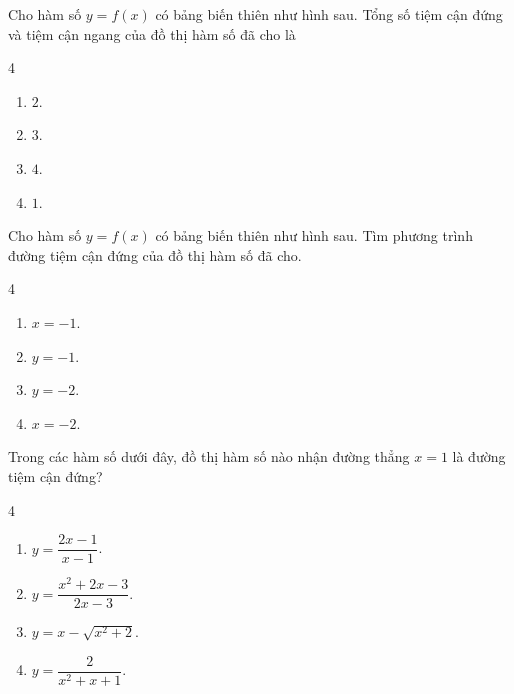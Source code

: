 \begin{baitap}
	Cho hàm số $y=f(x)$ có bảng biến thiên như hình sau. 	Tổng số tiệm cận đứng và tiệm cận ngang của đồ thị hàm số đã cho là
\begin{center}
\end{center}
	\begin{multicols}{4}
		\begin{enumerate}
			\item $2$.
			\item $3$.
			\item $4$.
			\item $1$.
		\end{enumerate}
	\end{multicols}
\end{baitap}

\begin{baitap}
	Cho hàm số $y=f(x)$ có bảng biến thiên như hình sau. Tìm phương trình đường tiệm cận đứng của đồ thị hàm số đã cho.
	\begin{center}
	\end{center}
	\begin{multicols}{4}
	\begin{enumerate}
		\item $x = -1$.
		\item $y = -1$.
		\item $y = -2$.
		\item $x = -2$.
	\end{enumerate}
	\end{multicols}
\end{baitap}


\begin{baitap}
	Trong các hàm số dưới đây, đồ thị hàm số nào nhận đường thẳng $x=1$ là đường tiệm cận đứng?
	\begin{multicols}{4}
		\begin{enumerate}
			\item $y = \dfrac{2x-1}{x-1}$.
			\item $y = \dfrac{x^2+2x-3}{2x-3}$.
			\item $y = x - \sqrt{x^2+2}$.
			\item $y = \dfrac{2}{x^2+x+1}$.
		\end{enumerate}
	\end{multicols}
\end{baitap}

